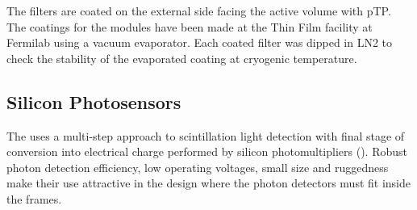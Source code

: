 The filters are coated on the external side facing the \lar active volume with pTP.  The coatings for the  modules have been made at the Thin Film facility at Fermilab using a vacuum evaporator. Each coated filter was dipped in LN2 to check the stability of the evaporated coating at cryogenic temperature. 




%




\subsection{Silicon Photosensors}
\label{sec:fdsp-pd-ps}

The   uses a multi-step approach to scintillation light detection with final stage of conversion into electrical charge performed by silicon photomultipliers (). Robust photon detection efficiency, low operating voltages, small size and ruggedness make their use attractive in the \single design where the photon detectors must  %
fit  inside the  frames. 

